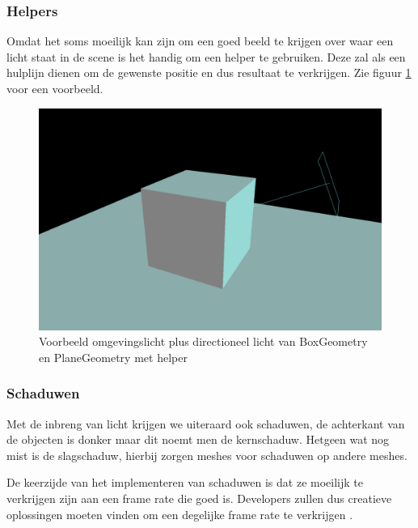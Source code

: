 \subsubsection{Helpers}

Omdat het soms moeilijk kan zijn om een goed beeld te krijgen over waar een licht staat in de scene is het handig om een helper te gebruiken. Deze zal als een hulplijn dienen om de gewenste positie en dus resultaat te verkrijgen. Zie figuur \ref{fig:directionalLightHelper} voor een voorbeeld.

\begin{figure}
	\centering
	\includegraphics[width=1\linewidth]{graphics/directionalLightHelper}
	\caption[Voorbeeld omgevingslicht plus directioneel licht van BoxGeometry en PlaneGeometry met helper]{Voorbeeld omgevingslicht plus directioneel licht van BoxGeometry en PlaneGeometry met helper}
	\label{fig:directionalLightHelper}
\end{figure}

\subsubsection{Schaduwen}

Met de inbreng van licht krijgen we uiteraard ook schaduwen, de achterkant van de objecten is donker maar dit noemt men de kernschaduw. Hetgeen wat nog mist is de slagschaduw, hierbij zorgen meshes voor schaduwen op andere meshes.

De keerzijde van het implementeren van schaduwen is dat ze moeilijk te verkrijgen zijn aan een frame rate die goed is. Developers zullen dus creatieve oplossingen moeten vinden om een degelijke frame rate te verkrijgen \autocite{Simon2023}.

